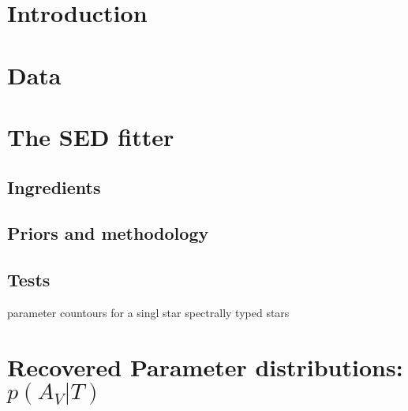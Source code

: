 

\section{Introduction}


\section{Data}

\section{The SED fitter}

\subsection{Ingredients}

\subsection{Priors and methodology}

\subsection{Tests}
parameter countours for a singl star
spectrally typed stars


\section{Recovered Parameter distributions: $p(A_V | T)$}


